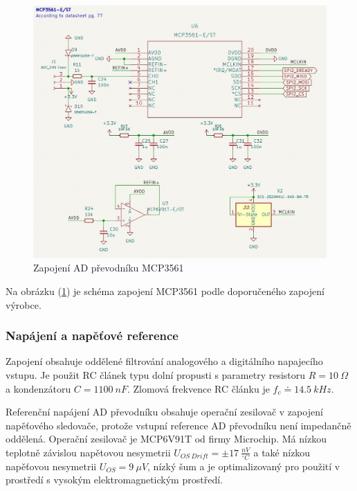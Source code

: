 \begin{figure}[H]
    \centering
    \caption{Zapojení AD převodníku MCP3561}
    \label{fig:mcp3561_connection}
    \includegraphics[width=1\linewidth]{pictures/mcp3561_connection.jpg}
\end{figure}
Na obrázku (\ref{fig:mcp3561_connection}) je schéma zapojení MCP3561 podle doporučeného zapojení výrobce.
\subsubsection{Napájení a napěťové reference}
Zapojení obsahuje oddělené filtrování analogového a digitálního napajecího vstupu. Je použit RC článek typu dolní propusti s parametry resistoru $R = 10 \ \Omega$ a kondenzátoru $C = 1100 \ nF$. Zlomová frekvence RC článku je $f_c \doteq 14.5 \ kHz$.
\par
Referenční napájení AD převodníku obsahuje operační zesilovač v zapojení napěťového sledovače, protože vstupní reference AD převodníku není impedančně oddělená. Operační zesilovač je MCP6V91T od firmy Microchip. Má nízkou teplotně závislou napětovou nesymetrii $U_{OS \ Drift} = \pm 17  \ \frac{nV}{^\circ C}$
a také nízkou napěťovou nesymetrii $U_{OS} = 9 \ \mu V$, nízký šum a je optimalizovaný pro použití v prostředí s vysokým elektromagnetickým prostředí.

